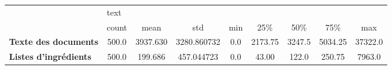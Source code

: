 \begin{tabular}{lcccccccc}
\toprule
{} & \multicolumn{8}{l}{text} \\
{} &  count &      mean &          std &  min &      25\% &     50\% &      75\% &      max \\
\midrule
\textbf{Texte des documents } &  500.0 &  3937.630 &  3280.860732 &  0.0 &  2173.75 &  3247.5 &  5034.25 &  37322.0 \\
\textbf{Listes d'ingrédients} &  500.0 &   199.686 &   457.044723 &  0.0 &    43.00 &   122.0 &   250.75 &   7963.0 \\
\bottomrule
\end{tabular}
